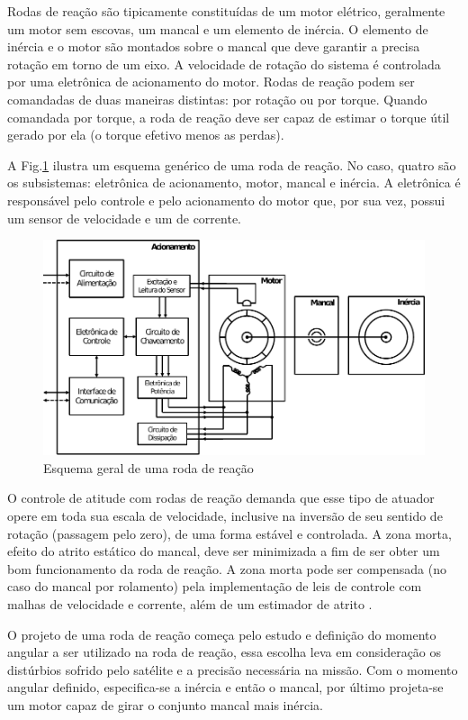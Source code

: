 Rodas de reação são tipicamente constituídas de um motor elétrico, geralmente um motor sem escovas, um mancal e um elemento de inércia.  O elemento de inércia e o motor são montados sobre o mancal que deve garantir a  precisa rotação em torno de um eixo. A velocidade de rotação do sistema é controlada por uma eletrônica de acionamento do motor. Rodas de reação podem ser comandadas de duas maneiras distintas: por rotação ou por torque. Quando comandada por torque, a roda de reação deve ser capaz de estimar o torque útil gerado por ela (o torque efetivo menos as perdas). 

A Fig.\ref{fig:EsquemaRoda} ilustra um esquema genérico de uma roda de reação. No caso, quatro são os subsistemas: eletrônica de acionamento, motor, mancal e inércia. A eletrônica é responsável pelo controle e pelo acionamento do motor que, por sua vez, possui um sensor de velocidade e um de corrente. 


\begin{figure}[ht!]
\centering
\includegraphics[width=1\linewidth]{./Figs/EsquemaRoda}
\caption{Esquema geral de uma roda de reação}
\label{fig:EsquemaRoda}
\end{figure}

O controle de atitude  com rodas de reação demanda que esse tipo de  atuador opere em toda sua escala de velocidade, inclusive na inversão de seu sentido de rotação (passagem pelo zero), de uma forma estável e controlada. A zona morta, efeito do atrito estático do mancal, deve ser minimizada a fim de ser obter um bom funcionamento da roda de reação. A zona morta pode ser compensada (no caso do mancal por rolamento) pela implementação de leis de controle com malhas de velocidade e corrente, além de um estimador de atrito \citep{Carrara2010}.

O projeto de uma roda de reação começa pelo estudo e definição do momento angular a ser utilizado na roda de reação, essa escolha leva em consideração os distúrbios sofrido pelo satélite e a precisão necessária na missão. Com o momento angular definido, especifica-se a inércia e então o mancal, por último projeta-se um motor capaz de girar o conjunto mancal mais inércia.

